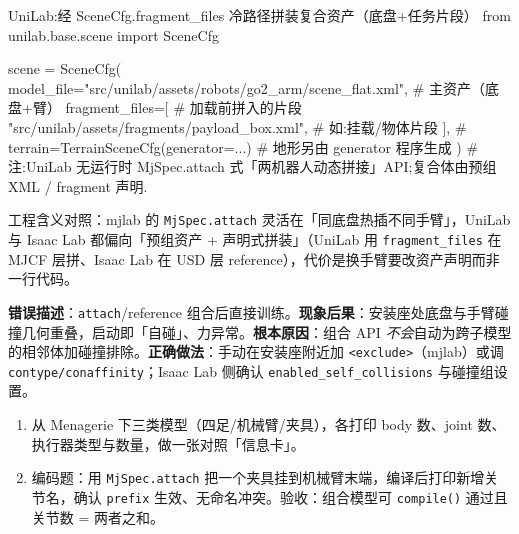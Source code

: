\begin{codebox}[Python]{UniLab:经 SceneCfg.fragment\_files 冷路径拼装复合资产（底盘+任务片段）}
from unilab.base.scene import SceneCfg

scene = SceneCfg(
    model_file="src/unilab/assets/robots/go2_arm/scene_flat.xml",  # 主资产（底盘+臂）
    fragment_files=[                                               # 加载前拼入的片段
        "src/unilab/assets/fragments/payload_box.xml",            # 如:挂载/物体片段
    ],
    # terrain=TerrainSceneCfg(generator=...)                       # 地形另由 generator 程序生成
)
# 注:UniLab 无运行时 MjSpec.attach 式「两机器人动态拼接」API;复合体由预组 XML / fragment 声明.
\end{codebox}

工程含义对照：mjlab 的 \texttt{MjSpec.\allowbreak attach} 灵活在「同底盘热插不同手臂」，UniLab 与 Isaac Lab 都偏向「预组资产 + 声明式拼装」（UniLab 用 \texttt{fragment\_files} 在 MJCF 层拼、Isaac Lab 在 USD 层 reference），代价是换手臂要改资产声明而非一行代码。

\begin{pitfall}
\textbf{错误描述}：\texttt{attach}/reference 组合后直接训练。\textbf{现象后果}：安装座处底盘与手臂碰撞几何重叠，启动即「自碰」、力异常。\textbf{根本原因}：组合 API \emph{不会}自动为跨子模型的相邻体加碰撞排除。\textbf{正确做法}：手动在安装座附近加 \texttt{<exclude>}（mjlab）或调 \texttt{contype/\allowbreak conaffinity}；Isaac Lab 侧确认 \texttt{enabled\_self\_collisions} 与碰撞组设置。
\end{pitfall}

\begin{practice}[动手：模型库与组合]
\begin{enumerate}
  \item 从 Menagerie 下三类模型（四足/机械臂/夹具），各打印 body 数、joint 数、执行器类型与数量，做一张对照「信息卡」。
  \item 编码题：用 \texttt{MjSpec.\allowbreak attach} 把一个夹具挂到机械臂末端，编译后打印新增关节名，确认 \texttt{prefix} 生效、无命名冲突。验收：组合模型可 \texttt{compile()} 通过且关节数 = 两者之和。
\end{enumerate}
\end{practice}

